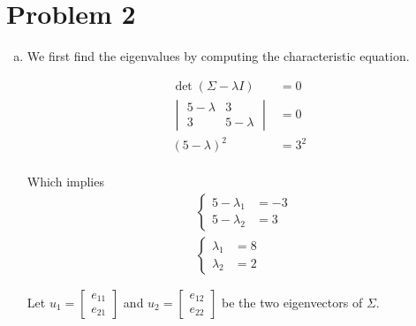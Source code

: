 \documentclass[a4paper, 10pt, twoside]{article}
\begin{document}
\section*{Problem 2}

\begin{enumerate}[a)]
    \item We first find the eigenvalues by computing the characteristic equation.

          \begin{align*}
              \det (\Sigma - \lambda I)  & = 0   \\
              \begin{vmatrix} 5 - \lambda & 3 \\ 3 & 5 - \lambda \end{vmatrix} & = 0   \\
              (5-\lambda)^2              & = 3^2 \\
          \end{align*}

          Which implies
          \begin{align*}
               & \begin{cases}
                  5 - \lambda_1 & = -3 \\
                  5 - \lambda_2 & = 3
              \end{cases} \\
               & \begin{cases}
                  \lambda_1 & = 8 \\
                  \lambda_2 & = 2
              \end{cases}
          \end{align*}

          Let $u_1 = \begin{bmatrix}e_{11} \\ e_{21}\end{bmatrix}$ and $u_2 = \begin{bmatrix}e_{12} \\ e_{22}\end{bmatrix}$ be the two eigenvectors of $\Sigma$.


\end{enumerate}
\end{document}
